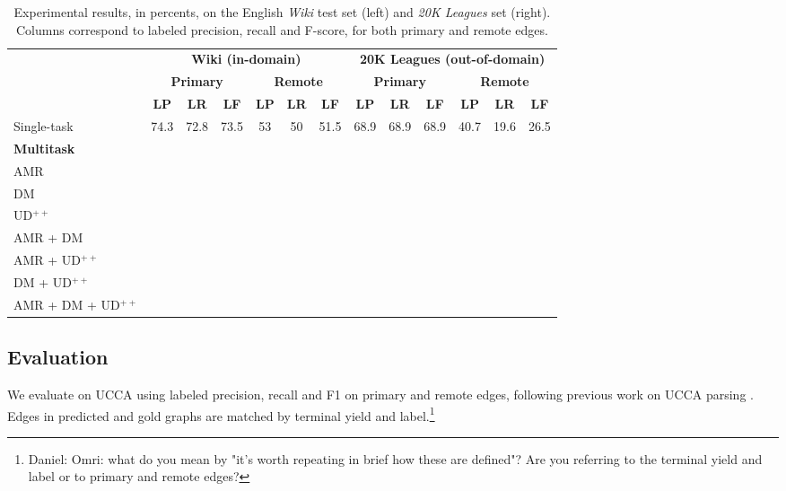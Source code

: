 \documentclass[11pt,a4paper]{article}
\newcommand{\daniel}[1]{\footnote{\color{blue}Daniel: #1}}
\begin{document}
\begin{table*}
\centering
\begin{tabular}{l|ccc|ccc||ccc|ccc}
& \multicolumn{6}{c||}{\footnotesize \bf Wiki (in-domain)}
& \multicolumn{6}{c}{\footnotesize \bf 20K Leagues (out-of-domain)} \\
& \multicolumn{3}{c|}{\footnotesize \bf Primary} & \multicolumn{3}{c||}{\footnotesize \bf Remote}
& \multicolumn{3}{c|}{\footnotesize \bf Primary} & \multicolumn{3}{c}{\footnotesize \bf Remote} \\
& \footnotesize \textbf{LP} & \footnotesize \textbf{LR} & \footnotesize \textbf{LF}
& \footnotesize \textbf{LP} & \footnotesize \textbf{LR} & \footnotesize \textbf{LF}
& \footnotesize \textbf{LP} & \footnotesize \textbf{LR} & \footnotesize \textbf{LF}
& \footnotesize \textbf{LP} & \footnotesize \textbf{LR} & \footnotesize \textbf{LF} \\
\hline
Single-task
& 74.3 & 72.8 & 73.5 & 53 & 50 & 51.5 & 68.9 & 68.9 & 68.9 & 40.7 & 19.6 & 26.5 \\
\hline
\small \bf Multitask &&&&&&&&& \\
AMR \\
DM \\
UD$^{++}$ \\
AMR + DM \\
AMR + UD$^{++}$ \\
DM + UD$^{++}$ \\
AMR + DM + UD$^{++}$ 
\end{tabular}
\caption{
Experimental results, in percents, on the English \textit{Wiki} test set (left)
and \textit{20K Leagues} set (right).
Columns correspond to labeled precision, recall and F-score,
for both primary and remote edges.
}
\label{tab:results}
\end{table*}


\subsection{Evaluation}\label{sec:evaluation}

We evaluate on UCCA using labeled precision, recall and F1 on primary and remote edges,
following previous work on UCCA parsing \cite{hershcovich2017a}.
Edges in predicted and gold graphs are matched by terminal yield and label.\daniel{Omri:
what do you mean by "it's worth repeating in brief how these are defined"?
Are you referring to the terminal yield and label or to primary and remote edges?}
\end{document}
